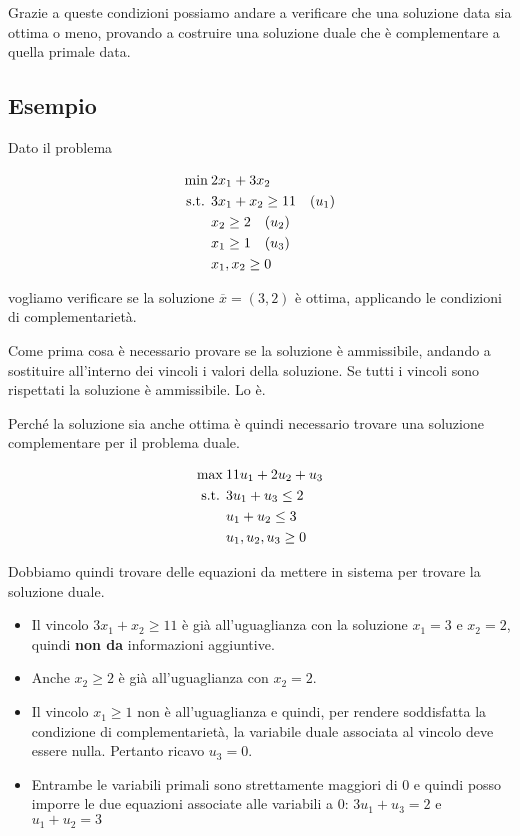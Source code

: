Grazie a queste condizioni possiamo andare a verificare che una soluzione data sia ottima o meno, provando a costruire una soluzione duale che è complementare a quella primale data.

\subsection{Esempio}

Dato il problema

\begin{align*}
    \min\:& 2x_1 + 3x_2 \\
     \text{s.t. }  & 3x_1 + x_2 \geq 11 \quad (u_1)\\
          & x_2 \geq 2 \quad (u_2) \\
          & x_1 \geq 1 \quad (u_3) \\
          & x_1, x_2 \geq 0
\end{align*}

vogliamo verificare se la soluzione $\overline{x} = (3,2)$ è ottima, applicando le condizioni di complementarietà.

Come prima cosa è necessario provare se la soluzione è ammissibile, andando a sostituire all'interno dei vincoli i valori della soluzione. Se tutti i vincoli sono rispettati la soluzione è ammissibile. Lo è.

Perché la soluzione sia anche ottima è quindi necessario trovare una soluzione complementare per il problema duale.

\begin{align*}
\max\:& 11u_1 + 2u_2 + u_3 \\
 \text{s.t. }  & 3u_1 + u_3 \leq 2 \\
      & u_1 + u_2 \leq 3\\
      & u_1, u_2, u_3 \geq 0
\end{align*}

Dobbiamo quindi trovare delle equazioni da mettere in sistema per trovare la soluzione duale.

\begin{itemize}
	\item Il vincolo $3x_1 + x_2 \geq 11$ è già all'uguaglianza con la soluzione $x_1 = 3$ e $x_2 = 2$, quindi \textbf{non da} informazioni aggiuntive.
	\item Anche $x_2 \geq 2$ è già all'uguaglianza con $x_2 = 2$.
	\item Il vincolo $ x_1 \geq 1 $ non è all'uguaglianza e quindi, per rendere soddisfatta la condizione di complementarietà, la variabile duale associata al vincolo deve essere nulla. Pertanto ricavo $u_3 = 0$.
	\item Entrambe le variabili primali sono strettamente maggiori di 0 e quindi posso imporre le due equazioni associate alle variabili a 0: $ 3u_1 + u_3 = 2$ e $u_1 + u_2 = 3$
\end{itemize}

